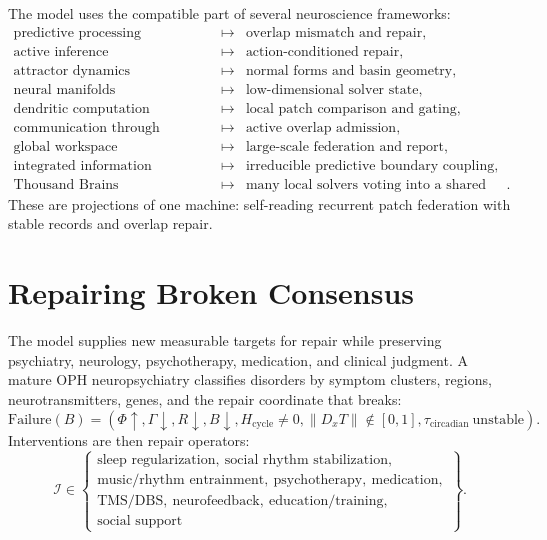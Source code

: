 \documentclass[11pt]{article}
\theoremstyle{remark}
\theoremstyle{plain}
\begin{document}
The model uses the compatible part of several neuroscience frameworks:
\[
\begin{array}{rcl}
\text{predictive processing} &\mapsto& \text{overlap mismatch and repair},\\
\text{active inference} &\mapsto& \text{action-conditioned repair},\\
\text{attractor dynamics} &\mapsto& \text{normal forms and basin geometry},\\
\text{neural manifolds} &\mapsto& \text{low-dimensional solver state},\\
\text{dendritic computation} &\mapsto& \text{local patch comparison and gating},\\
\text{communication through coherence} &\mapsto& \text{active overlap admission},\\
\text{global workspace} &\mapsto& \text{large-scale federation and report},\\
\text{integrated information} &\mapsto& \text{irreducible predictive boundary coupling},\\
\text{Thousand Brains} &\mapsto& \text{many local solvers voting into a shared model}.
\end{array}
\]
These are projections of one machine: self-reading recurrent patch federation with stable records and overlap repair.

\section{Repairing Broken Consensus}

The model supplies new measurable targets for repair while preserving psychiatry, neurology, psychotherapy, medication, and clinical judgment. A mature OPH neuropsychiatry classifies disorders by symptom clusters, regions, neurotransmitters, genes, and the repair coordinate that breaks:
\[
\boxed{
\mathrm{Failure}(B)
=
(
\Phi\uparrow,
\Gamma\downarrow,
R\downarrow,
B\downarrow,
H_{\mathrm{cycle}}\ne0,
\|D_xT\|\notin[0,1],
\tau_{\mathrm{circadian}}\ \mathrm{unstable}
).
}
\]
Interventions are then repair operators:
\[
\mathcal I
\in
\left\{
\begin{array}{l}
\text{sleep regularization},\ \text{social rhythm stabilization},\\
\text{music/rhythm entrainment},\ \text{psychotherapy},\ \text{medication},\\
\text{TMS/DBS},\ \text{neurofeedback},\ \text{education/training},\\
\text{social support}
\end{array}
\right\}.
\]
\end{document}
